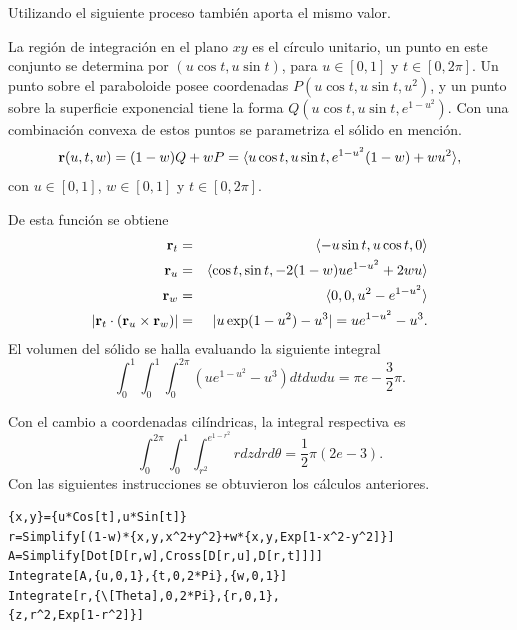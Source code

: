 Utilizando el siguiente proceso también aporta el mismo valor.


La región de integración en el plano $xy$ es el círculo unitario, un punto en este conjunto se determina por {\small $(u\cos t,u\sin t)$,} para $u\in [0,1]$ y {\small $t\in [0,2\pi]$.}
Un punto sobre el paraboloide posee coordenadas {\small $P( u\cos t,u\sin t,u^{2})$,}
y un punto sobre la superficie exponencial tiene la forma
{\small $Q(u\cos t,u\sin t,e^{1-u^{2}})$.} Con una combinación convexa de estos puntos se parametriza el sólido en mención.
\begin{multline*}
{\bf r}( u,t,w) = (1-w) Q +wP = \langle u\cos t,u\sin t,e^{1-u^{2}}( 1-w) +wu^{2}\rangle,
\end{multline*}
con $u\in [0,1]$, $w\in [0,1]$ y $t\in [0,2\pi ]$.

%
De esta función se obtiene
\begin{eqnarray*}
{\bf r}_{t} &=& \langle -u\sin t,u\cos t,0\rangle \\
{\bf r}_{u} &=&\langle \cos t,\sin t,-2( 1-w)
ue^{1-u^{2}}+2wu\rangle \\
{\bf r}_{w}&=& \langle 0,0,u^{2}-e^{1-u^{2}}\rangle \\
|{\bf r}_{t}\cdot ({\bf r}_{u}\times {\bf r}_{w})| &=& |u\exp(1-u^{2})-u^{3}|=ue^{1-u^{2}}-u^{3}.
\end{eqnarray*}
%
El volumen del sólido se halla evaluando la siguiente integral
%
\[\int_{0}^{1}\int_{0}^{1}\int_{0}^{2\pi }( ue^{1-u^{2}}-u^{3})
dtdwdu= \pi e-\frac{3}{2}\pi.\]
%

Con el cambio a coordenadas cilíndricas, la integral respectiva es
\[\int_{0}^{2\pi }\int_{0}^{1}\int_{r^{2}}^{e^{1-r^{2}}}rdzdrd\theta
= \frac{1}{2}\pi ( 2e-3).\]
%
Con las siguientes instrucciones se obtuvieron los cálculos anteriores.

\begin{tcolorbox}[title=\bf Instrucción en \verb"Mathematica"]\begin{Verbatim}[formatcom=\letraverbatim]
{x,y}={u*Cos[t],u*Sin[t]}
r=Simplify[(1-w)*{x,y,x^2+y^2}+w*{x,y,Exp[1-x^2-y^2]}]
A=Simplify[Dot[D[r,w],Cross[D[r,u],D[r,t]]]]
Integrate[A,{u,0,1},{t,0,2*Pi},{w,0,1}]
Integrate[r,{\[Theta],0,2*Pi},{r,0,1},
{z,r^2,Exp[1-r^2]}]
\end{Verbatim}
\end{tcolorbox}

